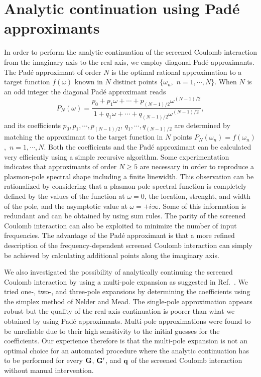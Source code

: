 \documentclass[twocolumn,prb,showpacs,superscriptaddress]{revtex4}
\def\w{\omega}
\def\q{{\bf q}}
\def\G{{\bf G}}
\def\Gp{{\bf G^\prime}}
\begin{document}
\section{Analytic continuation using Pad\'e approximants}\label{app.pade}

In order to perform the analytic continuation of the screened Coulomb interaction
from the imaginary axis to the real axis, we employ diagonal 
Pad\'e approximants.\cite{pade1,pade2,blochl}
The Pad\'e approximant of order $N$ is the optimal rational approximation
to a target function $f(\w)$ known in $N$ distinct points 
$\{\w_n$,~$n=1,\cdots,N\}$. 
When $N$ is an odd integer the diagonal Pad\'e approximant reads
  \begin{equation}
  P_N(\w) = \frac{p_0+p_1\w+\cdots+p_{(N-1)/2}\w^{(N-1)/2}}
  {1+q_1\w+\cdots+q_{(N-1)/2}\w^{(N-1)/2}},
  \end{equation}
and its coefficients $p_0, p_1, \cdots, p_{(N-1)/2}$, $q_1, \cdots, q_{(N-1)/2}$ are determined by matching the approximant
to the target function in $N$ points $P_N(\w_n)=f(\w_n)$,~$n=1,\cdots,N$.
Both the coefficients and the Pad\'e approximant can be calculated
very efficiently using a simple recursive algorithm.\cite{pade2}
Some experimentation indicates that approximants of order $N\ge5$ are necessary
in order to reproduce a plasmon-pole spectral shape including a finite linewidth.
This observation can be rationalized by considering that a plasmon-pole
spectral function is completely defined by the values of the function at $\w=0$,
the location, strenght, and width of the pole, and the asymptotic value at $\w=+i\infty$.
Some of this information is redundant and can be obtained by using sum rules.\cite{hl86}
The parity of the screened Coulomb interaction can also be exploited to minimize
the number of input frequencies. 
The advantage of the Pad\'e approximant is that a more refined description
of the frequency-dependent screened Coulomb interaction can simply be achieved
by calculating additional points along the imaginary axis. 

We also investigated the possibility of analytically continuing
the screened Coulomb interaction by using a multi-pole expansion
as suggested in Ref.\ . 
We tried one-, two-, and three-pole
expansions by determining the coefficients using the simplex 
method of Nelder and Mead.\cite{nelder-mead}
The single-pole approximation appears robust but the quality
of the real-axis continuation is poorer than what we obtained
by using Pad\'e approximants. Multi-pole approximations were found
to be unreliable due to their high sensitivity to the initial guesses 
for the coefficients.
Our experience therefore is that the multi-pole expansion is not an optimal 
choice for an automated procedure where the analytic continuation has to be
performed for every $\G$, $\Gp$, and $\q$ of the screened Coulomb 
interaction without manual intervention. 
\end{document}
